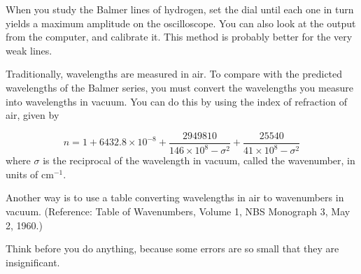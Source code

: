 \documentclass{../lab}
\begin{document}
When you study the Balmer lines of hydrogen, set the dial until each one in turn yields a maximum amplitude on the oscilloscope. You can also look at the output from the computer, and calibrate it. This method is probably better for the very weak lines.

Traditionally, wavelengths are measured in air. To compare with the predicted wavelengths of the Balmer series, you must convert the wavelengths you measure into wavelengths in vacuum. You can do this by using the index of refraction of air, given by

\begin{equation}
    n=1+6432.8 \times 10^{-8}+\frac{2949810}{146\times10^8-\sigma^{2}}+\frac{25540}{41\times10^8-\sigma^{2}}
\end{equation}
where $\sigma$ is the reciprocal of the wavelength in vacuum, called the wavenumber, in units of cm$^{-1}$.

Another way is to use a table converting wavelengths in air to wavenumbers in vacuum. (Reference: Table of Wavenumbers, Volume 1, NBS Monograph 3, May 2, 1960.)

Think before you do anything, because some errors are so small that they are insignificant.
\end{document}
